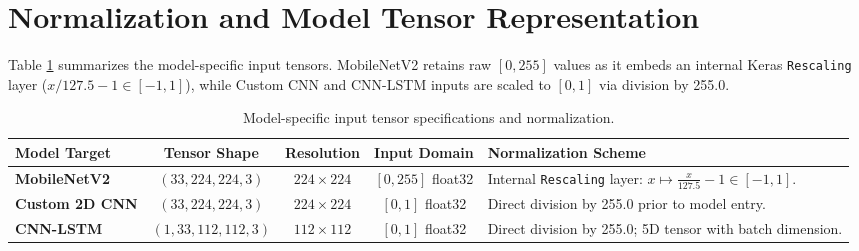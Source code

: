 \section{Normalization and Model Tensor Representation}
\label{sec:normalization}
Table \ref{tab:preproc_specs} summarizes the model-specific input tensors. MobileNetV2 retains raw $[0, 255]$ values as it embeds an internal Keras \texttt{Rescaling} layer ($x/127.5 - 1 \in [-1, 1]$), while Custom CNN and CNN-LSTM inputs are scaled to $[0, 1]$ via division by 255.0.

\begin{table}[htbp]
\centering
\caption{Model-specific input tensor specifications and normalization.}
\label{tab:preproc_specs}
\scriptsize
\begin{tabularx}{\textwidth}{l c c c X}
\toprule
\textbf{Model Target} & \textbf{Tensor Shape} & \textbf{Resolution} & \textbf{Input Domain} & \textbf{Normalization Scheme} \\
\midrule
\textbf{MobileNetV2} & $(33, 224, 224, 3)$ & $224\times224$ & $[0, 255]$ float32 & Internal \texttt{Rescaling} layer: $x \mapsto \frac{x}{127.5}-1 \in [-1, 1]$. \\
\textbf{Custom 2D CNN} & $(33, 224, 224, 3)$ & $224\times224$ & $[0, 1]$ float32 & Direct division by 255.0 prior to model entry. \\
\textbf{CNN-LSTM} & $(1, 33, 112, 112, 3)$ & $112\times112$ & $[0, 1]$ float32 & Direct division by 255.0; 5D tensor with batch dimension. \\
\bottomrule
\end{tabularx}
\end{table}
